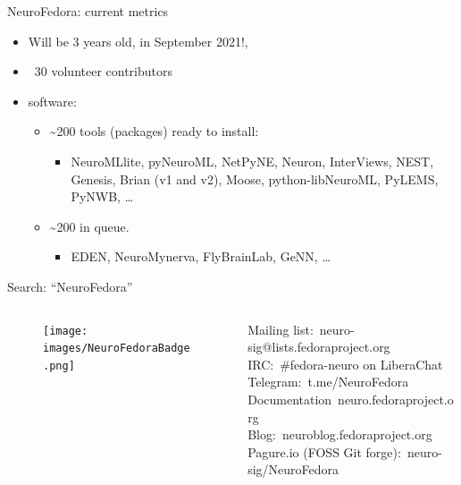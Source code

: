 \begin{frame}[c]{NeuroFedora: current metrics}
	\begin{itemize}
		\item \alert{Will be 3 years old, in September 2021!\footnotemark[8],}
		\item \textcolor{FirstGreen}{~30 volunteer contributors}
		\item \textcolor{FriendsMagenta}{software:}
		\begin{itemize}
			\item \textasciitilde{}200 tools (packages) ready to install\footnotemark[9]:
			\begin{itemize}
				\item NeuroMLlite, pyNeuroML, NetPyNE, Neuron, InterViews, NEST, Genesis, Brian (v1 and v2), Moose, python-libNeuroML, PyLEMS, PyNWB, \ldots
			\end{itemize}
			\item \textasciitilde{}200 in queue\footnotemark[10].
			\begin{itemize}
				\item EDEN, NeuroMynerva, FlyBrainLab, GeNN, \ldots
			\end{itemize}
		\end{itemize}
	\end{itemize}
\end{frame}

\begin{frame}[c]{Search: ``NeuroFedora''}
	\begin{columns}
		\begin{column}{0.3\textwidth}
			\begin{figure}[h]
				\centering
				\texttt{[image: images/NeuroFedoraBadge.png]}
			\end{figure}
		\end{column}
		\begin{column}{0.8\textwidth}
			\textcolor{FedoraBlue}{Mailing list:\ neuro-sig@lists.fedoraproject.org}\\
			\textcolor{FirstGreen}{IRC:\ \#fedora-neuro on LiberaChat}\\
			\textcolor{FeaturesOrange}{Telegram:\ t.me/NeuroFedora}\\
			\textcolor{FriendsMagenta}{Documentation\ neuro.fedoraproject.org}\\
			\textcolor{FirstGreen}{Blog:\ neuroblog.fedoraproject.org}\\
			\textcolor{FeaturesOrange}{Pagure.io (FOSS Git forge):\ neuro-sig/NeuroFedora}
		\end{column}
	\end{columns}
\end{frame}


